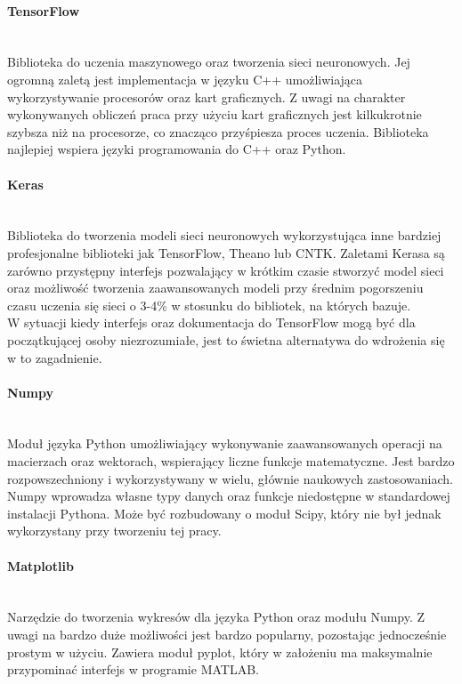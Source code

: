 \paragraph{TensorFlow} \mbox{}\\
Biblioteka do uczenia maszynowego oraz tworzenia sieci neuronowych. Jej ogromną
zaletą jest implementacja w języku C++ umożliwiająca wykorzystywanie procesorów oraz
kart graficznych. Z uwagi na charakter wykonywanych obliczeń praca przy użyciu
kart graficznych jest kilkukrotnie szybsza niż na procesorze, co znacząco przyśpiesza
proces uczenia. Biblioteka najlepiej wspiera języki programowania do C++ oraz Python.

\paragraph{Keras} \mbox{}\\
Biblioteka do tworzenia modeli sieci neuronowych wykorzystująca inne bardziej
profesjonalne biblioteki jak TensorFlow, Theano lub CNTK. Zaletami Kerasa są
zarówno przystępny interfejs pozwalający w krótkim czasie stworzyć model sieci
oraz możliwość tworzenia zaawansowanych modeli przy średnim pogorszeniu czasu
uczenia się sieci o 3-4\% w stosunku do bibliotek, na których bazuje.\\
W sytuacji kiedy interfejs oraz dokumentacja do TensorFlow mogą być dla początkującej
osoby niezrozumiałe, jest to świetna alternatywa do wdrożenia się w to zagadnienie.

\paragraph{Numpy} \mbox{}\\
Moduł języka Python umożliwiający wykonywanie zaawansowanych operacji na macierzach
oraz wektorach, wspierający liczne funkcje matematyczne. Jest bardzo rozpowszechniony
i wykorzystywany w wielu, głównie naukowych zastosowaniach. Numpy wprowadza własne
typy danych oraz funkcje niedostępne w standardowej instalacji Pythona. Może być
rozbudowany o moduł Scipy, który nie był jednak wykorzystany przy tworzeniu tej pracy.

\paragraph{Matplotlib} \mbox{}\\
Narzędzie do tworzenia wykresów dla języka Python oraz modułu Numpy. Z uwagi na
bardzo duże możliwości jest bardzo popularny, pozostając jednocześnie prostym w
użyciu. Zawiera moduł pyplot, który w założeniu ma maksymalnie przypominać interfejs
w programie MATLAB.

